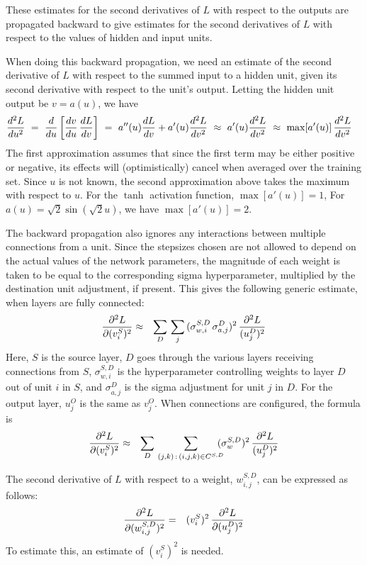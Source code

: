 \documentclass{report}[11pt]
\def\beq{\begin{eqnarray}}
\def\eeq{\end{eqnarray}}
\def\eep{\end{eqnarray}}
\begin{document}
These estimates for the second derivatives of $L$ with respect to the
outputs are propagated backward to give estimates for the second
derivatives of $L$ with respect to the values of hidden and input
units.  

When doing this backward propagation, we need an estimate of the
second derivative of $L$ with respect to the summed input to a
hidden unit, given its second derivative with respect to the unit's
output.  Letting the hidden unit output be $v = a(u)$, we have\beq
  {d^2L \over du^2}
   \ = \ {d \over du} \left[ {dv \over du}\, {dL \over dv} \right] 
   \ = \ a''(u) {dL \over dv} + a'(u) {d^2L \over dv^2}
   \ \approx \ a'(u) {d^2L \over dv^2} 
   \ \approx \ \max[a'(u)]\, {d^2L \over dv^2}\ \ \
\eeq%
The first approximation assumes that since the first term may be either
positive or negative, its effects will (optimistically) cancel when
averaged over the training set.  Since $u$ is not known, the second
approximation above takes the maximum with respect to $u$.  
For the $\tanh$ activation function, $\max[a'(u)] = 1$, For
$a(u)=\sqrt{2}\sin(\sqrt{2}u)$, we have $\max[a'(u)] = 2$.

The backward propagation also ignores any interactions between
multiple connections from a unit.  Since the stepsizes chosen are not
allowed to depend on the actual values of the network parameters, the
magnitude of each weight is taken to be equal to the corresponding
sigma hyperparameter, multiplied by the destination unit adjustment,
if present.  This gives the following generic estimate, when layers
are fully connected:\beq
  {\partial^2 L \over \partial (v^S_i)^2} & \approx &
     \sum_D\, \sum_j\, (\sigma^{S,D}_{w,i}\, \sigma^D_{a,j})^2\, 
     {\partial^2 L \over (u^D_j)^2}
\eeq%
Here, $S$ is the source layer, $D$ goes through the various layers
receiving connections from $S$, $\sigma^{S,D}_{w,i}$ is the
hyperparameter controlling weights to layer $D$ out of unit $i$ in
$S$, and $\sigma^D_{a,j}$ is the sigma adjustment for unit $j$ in $D$.
For the output layer, $u^O_j$ is the same as $v^O_j$.
When connections are configured, the formula is
\beq
  {\partial^2 L \over \partial (v^S_i)^2} & \approx &
     \sum_D\, \sum_{(j,k)\,:\,(i,j,k)\in C^{S,D}}\!\!\!\!
       (\sigma^{S,D}_w)^2\, {\partial^2 L \over (u^D_j)^2}
\eep
     
The second derivative of $L$ with respect to a weight, $w^{S,D}_{i,j}$,
can be expressed as follows:\beq
  {\partial^2 L \over \partial (w^{S,D}_{i,j})^2} & = &
    (v^S_i)^2\,{\partial^2 L \over \partial (u^D_j)^2}
\eeq%
To estimate this, an estimate of $(v^S_i)^2$ is needed.
\end{document}
